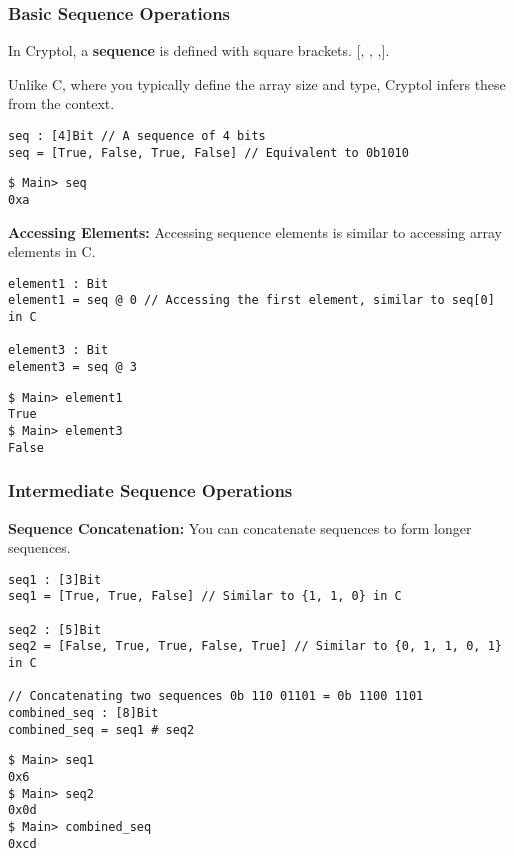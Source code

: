 \subsubsection{Basic Sequence Operations}
\begin{tcolorbox}[colframe=defcolor,title={\color{white}\bf Sequence}]
In Cryptol, a \textbf{sequence} is defined with square brackets. $\texttt{[, , ,]}$.
\end{tcolorbox}
\begin{remark}
Unlike C, where you typically define the array size and type, Cryptol infers these from the context.
\end{remark}
\begin{lstlisting}[style=cryptol]
seq : [4]Bit // A sequence of 4 bits
seq = [True, False, True, False] // Equivalent to 0b1010
\end{lstlisting}
\begin{lstlisting}[style=zsh]
$ Main> seq
0xa
\end{lstlisting}
\vspace{16pt}
\textbf{Accessing Elements:} Accessing sequence elements is similar to accessing array elements in C.
\begin{lstlisting}[style=cryptol]
element1 : Bit
element1 = seq @ 0 // Accessing the first element, similar to seq[0] in C

element3 : Bit
element3 = seq @ 3
\end{lstlisting}
\begin{lstlisting}[style=zsh]
$ Main> element1
True
$ Main> element3
False
\end{lstlisting}

\subsubsection{Intermediate Sequence Operations}
\textbf{Sequence Concatenation:} You can concatenate sequences to form longer sequences.
\begin{lstlisting}[style=cryptol]
seq1 : [3]Bit
seq1 = [True, True, False] // Similar to {1, 1, 0} in C

seq2 : [5]Bit
seq2 = [False, True, True, False, True] // Similar to {0, 1, 1, 0, 1} in C

// Concatenating two sequences 0b 110 01101 = 0b 1100 1101
combined_seq : [8]Bit
combined_seq = seq1 # seq2
\end{lstlisting}
\begin{lstlisting}[style=zsh]
$ Main> seq1
0x6
$ Main> seq2
0x0d
$ Main> combined_seq
0xcd
\end{lstlisting}

